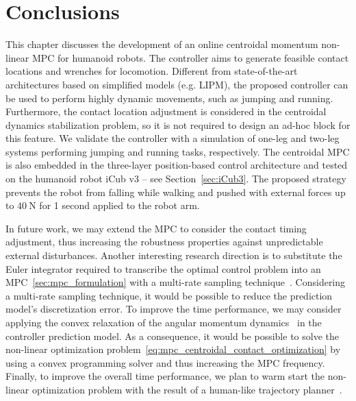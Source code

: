\section{Conclusions\label{sec:centroidal_mpc_conclusion}}
This chapter discusses the development of an online centroidal momentum non-linear MPC for humanoid robots. 
The controller aims to generate feasible contact locations and wrenches for locomotion.
Different from state-of-the-art architectures based on simplified models (e.g. LIPM), the proposed controller can be used to perform highly dynamic movements, such as jumping and running. Furthermore, the contact location adjustment is considered in the centroidal dynamics stabilization problem, so it is not required to design an ad-hoc block for this feature. We validate the controller with a simulation of one-leg and two-leg systems performing jumping and running tasks, respectively. 
The centroidal MPC is also embedded in the three-layer position-based control architecture and tested on the humanoid robot iCub v3 -- see Section~\ref{sec:iCub3}. The proposed strategy prevents the robot from falling while walking and pushed with external forces up to $\SI{40}{\newton}$ for 1 second applied to the robot arm.
\par
In future work, we may extend the MPC to consider the contact timing adjustment, thus increasing the robustness properties against unpredictable external disturbances.
Another interesting research direction is to substitute the Euler integrator required to transcribe the optimal control problem into an MPC~\ref{sec:mpc_formulation} with a multi-rate sampling technique~\citep{Elobaid2020Sampled-dataPlanning,Elobaid2019OnSampling}. Considering a multi-rate sampling technique, it would be possible to reduce the prediction model's discretization error. To improve the time performance, we may consider applying the convex relaxation of the angular momentum dynamics~\citep{Ponton2018,Ponton2016AGeneration} in the controller prediction model. As a consequence, it would be possible to solve the non-linear optimization problem~\eqref{eq:mpc_centroidal_contact_optimization} by using a convex programming solver and thus increasing the MPC frequency.  
Finally, to improve the overall time performance, we plan to warm start the non-linear optimization problem with the result of a human-like trajectory planner~\citep{Viceconte2022ADHERENT:Robots}.